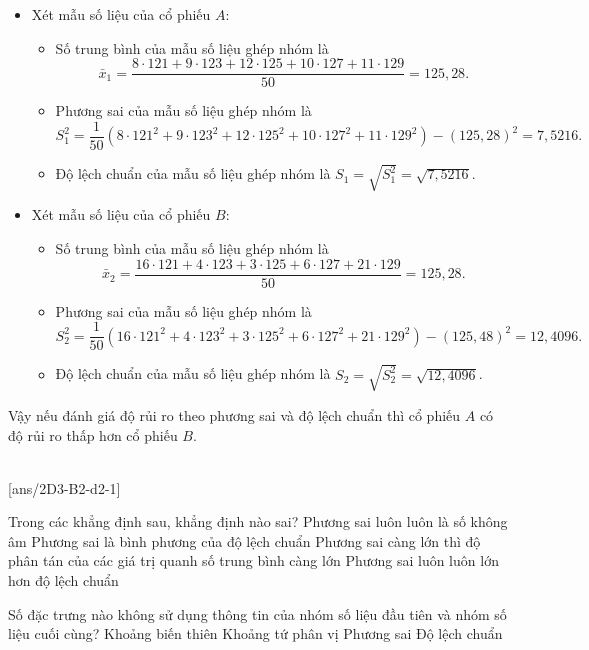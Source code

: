 \begin{vd}
{\begin{itemize}
		\item Xét mẫu số liệu của cổ phiếu $A$:
		\begin{itemize}
			\item Số trung bình của mẫu số liệu ghép nhóm là
			$$
			\bar{x}_1=\dfrac{8 \cdot 121+9\cdot 123+12 \cdot 125+10\cdot 127+11\cdot 129}{50}=125,28.
			$$
			\item Phương sai của mẫu số liệu ghép nhóm là
			$$
			S_1^2=\dfrac{1}{50}\left(8 \cdot 121^2+9 \cdot 123^2+12 \cdot 125^2+10 \cdot 127^2+11 \cdot 129^2\right)-(125,28)^2=7,5216.
			$$
			\item Độ lệch chuẩn của mẫu số liệu ghép nhóm là $S_1=\sqrt{S_1^2}=\sqrt{7,5216}$.
		\end{itemize}
		\item Xét mẫu số liệu của cổ phiếu $B$:
		\begin{itemize}
			\item Số trung bình của mẫu số liệu ghép nhóm là
			$$
			\bar{x}_2=\dfrac{16\cdot 121+4\cdot 123+3\cdot 125+6\cdot 127+21\cdot 129}{50}=125,28.
			$$
			\item Phương sai của mẫu số liệu ghép nhóm là
			$$
			S_2^2=\dfrac{1}{50}\left(16\cdot 121^2+4\cdot 123^2+3 \cdot 125^2+6 \cdot 127^2+21\cdot 129^2\right)-(125,48)^2=12,4096.$$
			\item Độ lệch chuẩn của mẫu số liệu ghép nhóm là $S_2=\sqrt{S_2^2}=\sqrt{12,4096}$.
		\end{itemize}
	\end{itemize}	
	Vậy nếu đánh giá độ rủi ro theo phương sai và độ lệch chuẩn thì cổ phiếu $A$ có độ rủi ro thấp hơn cổ phiếu $B$.
}
\end{vd}
 \\
\setcounter{ex}{0}
[ans/2D3-B2-d2-1]
\begin{ex}
	Trong các khẳng định sau, khẳng định nào sai?
	\choice
	{Phương sai luôn luôn là số không âm}
	{Phương sai là bình phương của độ lệch chuẩn}
	{Phương sai càng lớn thì độ phân tán của các giá trị quanh số trung bình càng lớn}
	{\True Phương sai luôn luôn lớn hơn độ lệch chuẩn}
\end{ex}

\begin{ex}
	Số đặc trưng nào không sử dụng thông tin của nhóm số liệu đầu tiên và nhóm số liệu cuối cùng?
	\choice
	{Khoảng biến thiên}
	{\True Khoảng tứ phân vị}
	{Phương sai}
	{Độ lệch chuẩn}
\end{ex}

